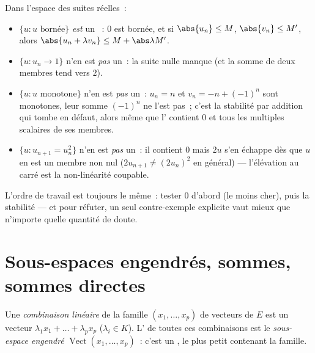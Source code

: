 \begin{example}
\label{ex:b1:vspaces:subspaceornot}
Dans l'espace des suites réelles~:
\begin{itemize}
  \item $\{u : u \text{ bornée}\}$ \emph{est} un ~: $0$ est
        bornée, et si $\abs{u_n} \leq M$, $\abs{v_n} \leq M'$,
        alors $\abs{u_n + \lambda v_n} \leq M + \abs\lambda M'$.
  \item $\{u : u_n \to 1\}$ n'en est \emph{pas} un~: la suite nulle
        manque (et la somme de deux membres tend vers $2$).
  \item $\{u : u \text{ monotone}\}$ n'en est \emph{pas} un~: $u_n = n$
        et $v_n = -n + (-1)^n$ sont monotones, leur somme
        $(-1)^n$ ne l'est pas~; c'est la stabilité par addition qui
        tombe en défaut, alors même que l' contient $0$ et
        tous les multiples scalaires de ses membres.
  \item $\{u : u_{n+1} = u_n^2\}$ n'en est \emph{pas} un~: il contient
        $0$ mais $2u$ s'en échappe dès que $u$ en est un membre non
        nul ($2u_{n+1} \neq (2u_n)^2$ en général) --- l'élévation au
        carré est la non-linéarité coupable.
\end{itemize}
L'ordre de travail est toujours le même~: tester $0$ d'abord (le
moins cher), puis la stabilité --- et pour réfuter, un seul
contre-exemple explicite vaut mieux que n'importe quelle quantité de
doute.
\end{example}

\section{Sous-espaces engendrés, sommes, sommes directes}

\begin{definition}\label{def:b1:vspaces:span}
Une \emph{combinaison linéaire} de la famille $(x_1, \dots, x_p)$ de
vecteurs de $E$ est un vecteur $\lambda_1 x_1 + \dots + \lambda_p x_p$
($\lambda_i \in K$). L' de toutes ces combinaisons est le
\emph{sous-espace engendré}
$\operatorname{Vect}(x_1, \dots, x_p)$~: c'est un , le plus
petit contenant la famille.
\end{definition}

